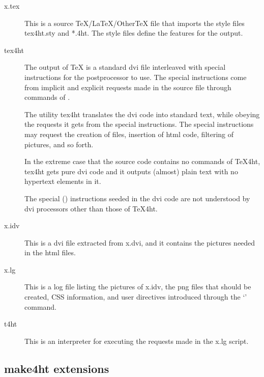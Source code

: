 \begin{description}
  \item[x.tex]

This is a source TeX/LaTeX/OtherTeX file that imports the style files tex4ht.sty and *.4ht. The style files define the features for the output.

\item[tex4ht]

The output of \TeX{} is a standard dvi file interleaved with special
instructions for the postprocessor  to use. The special
instructions come from implicit and explicit requests made in the source file
through commands of \texfourht.

The utility tex4ht translates the dvi code into standard text, while obeying
the requests it gets from the special instructions. The special instructions
may request the creation of files, insertion of html code, filtering of
pictures, and so forth.

In the extreme case that the source code contains no commands of TeX4ht, tex4ht
gets pure dvi code and it outputs (almost) plain text with no hypertext
elements in it.

The special (\texcommand{\special}) instructions seeded in the dvi code are not understood
by dvi processors other than those of TeX4ht.

\item[x.idv]

This is a dvi file extracted from x.dvi, and it contains the pictures needed in
the html files.

\item[x.lg]

This is a log file listing the pictures of x.idv, the png files that should be
created, CSS information, and user directives introduced through the
‘’ command.

\item[t4ht]
This is an interpreter for executing the requests made in the x.lg script.

\end{description}

\subsection{make4ht extensions}\label{sec:make4ht-extensions}
